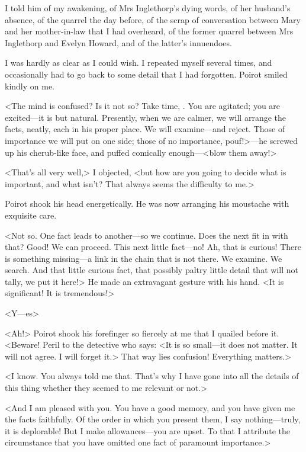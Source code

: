  I told him of my awakening, of Mrs Inglethorp's dying words, of her husband's absence, of the quarrel the day before, of the scrap of conversation between Mary and her mother-in-law that I had overheard, of the former quarrel between Mrs Inglethorp and Evelyn Howard, and of the latter's innuendoes. 

 I was hardly as clear as I could wish. I repeated myself several times, and occasionally had to go back to some detail that I had forgotten. Poirot smiled kindly on me. 

 <The mind is confused? Is it not so? Take time, . You are agitated; you are excited—it is but natural. Presently, when we are calmer, we will arrange the facts, neatly, each in his proper place. We will examine—and reject. Those of importance we will put on one side; those of no importance, pouf!>—he screwed up his cherub-like face, and puffed comically enough—<blow them away!> 

 <That's all very well,> I objected, <but how are you going to decide what is important, and what isn't? That always seems the difficulty to me.> 

 Poirot shook his head energetically. He was now arranging his moustache with exquisite care. 

 <Not so.  One fact leads to another—so we continue. Does the next fit in with that?  Good! We can proceed. This next little fact—no! Ah, that is curious! There is something missing—a link in the chain that is not there. We examine. We search. And that little curious fact, that possibly paltry little detail that will not tally, we put it here!> He made an extravagant gesture with his hand. <It is significant! It is tremendous!> 

 <Y—es\longdash> 

 <Ah!> Poirot shook his forefinger so fiercely at me that I quailed before it. <Beware! Peril to the detective who says: <It is so small—it does not matter. It will not agree. I will forget it.> That way lies confusion! Everything matters.> 

 <I know. You always told me that. That's why I have gone into all the details of this thing whether they seemed to me relevant or not.> 

 <And I am pleased with you. You have a good memory, and you have given me the facts faithfully. Of the order in which you present them, I say nothing—truly, it is deplorable! But I make allowances—you are upset. To that I attribute the circumstance that you have omitted one fact of paramount importance.> 

